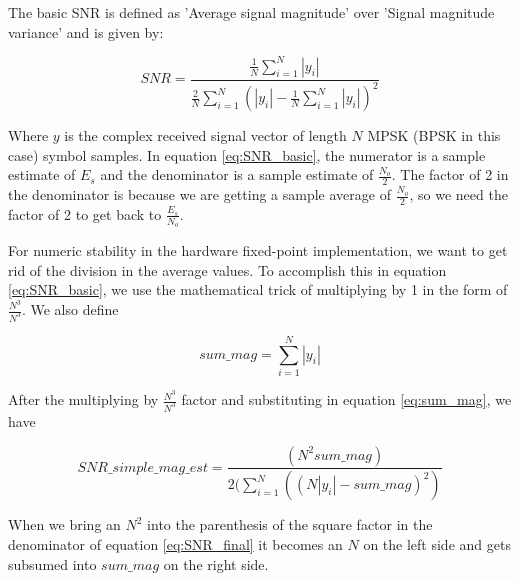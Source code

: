 \documentclass[12pt]{article}
\begin{document}
The basic SNR is defined as 'Average signal magnitude' over 'Signal magnitude variance' and is given by:

\begin{equation}
SNR  = \frac{\frac{1}{N}\sum_{i=1}^N |y_i|}{\frac{2}{N}\sum_{i=1}^N (|y_i| - \frac{1}{N}\sum_{i=1}^N |y_i|)^2}
	\label{eq:SNR_basic}
\end{equation}


Where $y$ is the complex received signal vector of length $N$ MPSK (BPSK in this case) symbol samples.  In equation \ref{eq:SNR_basic}, the numerator is a sample estimate of $E_s$ and the denominator is a sample estimate of $\frac{N_o}{2}$.  The factor of 2 in the denominator is because we are getting a sample average of $\frac{N_o}{2}$, so we need the factor of 2 to get back to $\frac{E_s}{N_o}$.  


For numeric stability in the hardware fixed-point implementation, we want to get rid of the division in the average values.  To accomplish this in equation \ref{eq:SNR_basic}, we use the mathematical trick of multiplying by 1 in the form of $\frac{N^3}{N^3}$.  We also define

\begin{equation}
sum\_mag  = \sum_{i=1}^N |y_i|
	\label{eq:sum_mag}
\end{equation}

After the multiplying by $\frac{N^3}{N^3}$ factor and substituting in equation \ref{eq:sum_mag}, we have 

\begin{equation}
SNR\_simple\_mag\_est = \frac{(N^2 sum\_mag)}{2(\sum_{i=1}^N((N |y_i| - sum\_mag)^2)}
	\label{eq:SNR_final}
\end{equation}

When we bring an $N^2$ into the parenthesis of the square factor in the denominator of equation \ref{eq:SNR_final} it becomes an $N$ on the left side and gets subsumed into $sum\_mag$ on the right side.
\end{document}
